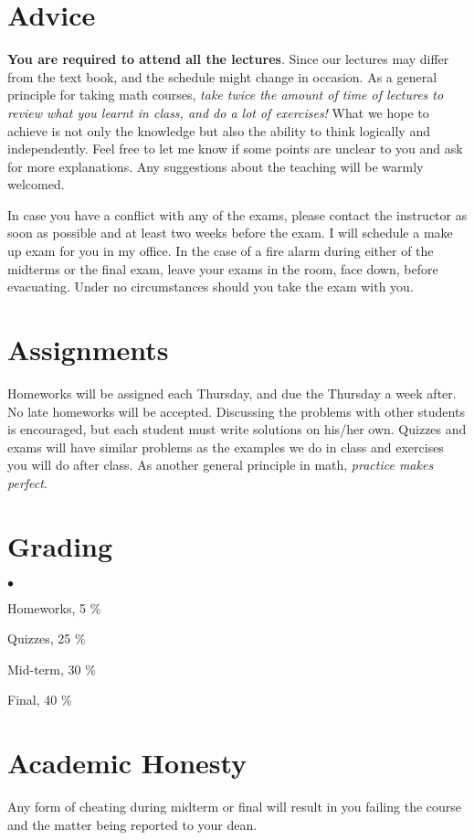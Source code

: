 \documentclass[margin,line]{res}
\newenvironment{list2}{
  \begin{list}{$\bullet$}{%
      \setlength{\itemsep}{0in}
      \setlength{\parsep}{0in} \setlength{\parskip}{0in}
      \setlength{\topsep}{0in} \setlength{\partopsep}{0in}
      \setlength{\leftmargin}{0.2in}}}{\end{list}}
\begin{document}
\begin{resume}
\section{\sc Advice}
{\bf You are required to attend all the lectures}. Since our
lectures may differ from the text book, and the
schedule might change in occasion. As a general principle for
taking math courses, \emph{take twice the amount of time of lectures
to review what you learnt in class, and do a lot of exercises!} What
we hope to achieve is not only the knowledge but also the ability
to think logically and independently. Feel free to let me know if
some points are unclear to you and ask for more explanations. Any
suggestions about the teaching will be warmly welcomed.

In case you have a conflict with any of the exams, please contact the
instructor as soon as possible and at least two weeks before the
exam. I will schedule a make up exam for you in my office. In the case of a fire alarm during either of the midterms or the final exam, leave your exams in the room, face down, before evacuating. Under no circumstances should you take the exam with you.


\section{\sc Assignments}
Homeworks will be assigned each Thursday, and due the Thursday a week after. No late homeworks will be accepted. Discussing the problems with other students is encouraged, but each student must write solutions on his/her own. Quizzes and exams will have similar problems as the examples we
do in class and exercises you will do after class. As another general principle in math,
\emph{practice makes perfect}.

\section{\sc Grading}
\begin{list2}
\item Homeworks, 5 \%
\item Quizzes, 25 \%
\item Mid-term, 30 \%
\item Final, 40 \%
\end{list2}

\section{\sc Academic Honesty} Any form of
cheating during midterm or final will result in you failing the
course and the matter being reported to your dean.

\end{resume}
\end{document}
